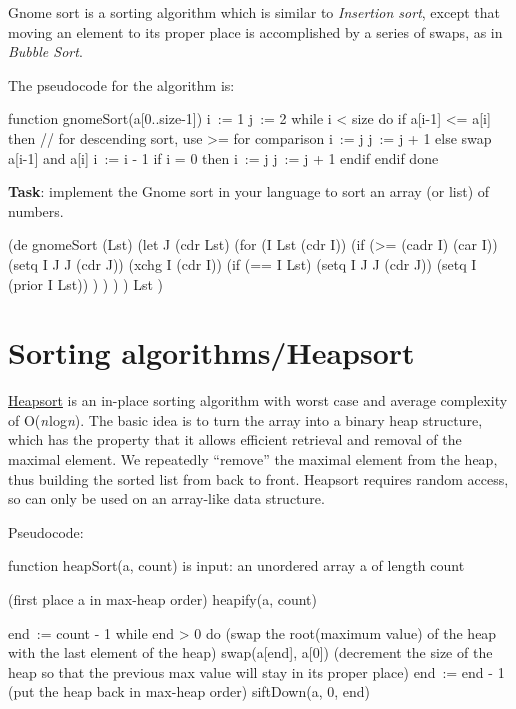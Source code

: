 Gnome sort is a sorting algorithm which is similar to \emph{Insertion
  sort}, except that moving an element to its proper place is
accomplished by a series of swaps, as in \emph{Bubble Sort}.

The pseudocode for the algorithm is:

\begin{wideverbatim}
function gnomeSort(a[0..size-1])
    i := 1
    j := 2
    while i < size do
        if a[i-1] <= a[i] then
            // for descending sort, use >= for comparison
            i := j
            j := j + 1 
        else
            swap a[i-1] and a[i]
            i := i - 1
            if i = 0 then
                i := j
                j := j + 1
            endif
        endif
    done
\end{wideverbatim}

\textbf{Task}: implement the Gnome sort in your language to sort an
array (or list) of numbers.

\begin{wideverbatim}
(de gnomeSort (Lst)
   (let J (cdr Lst)
      (for (I Lst (cdr I))
         (if (>= (cadr I) (car I))
            (setq I J  J (cdr J))
            (xchg I (cdr I))
            (if (== I Lst)
               (setq I J  J (cdr J))
               (setq I (prior I Lst)) ) ) ) )
   Lst )

\end{wideverbatim}

\pagebreak{}
\section*{Sorting algorithms/Heapsort}

\href{http://en.wikipedia.org/wiki/Heapsort}{Heapsort} is an in-place
sorting algorithm with worst case and average complexity of
O(\emph{n} log\emph{n}). The basic idea is to turn the array into a
binary heap structure, which has the property that it allows efficient
retrieval and removal of the maximal element. We repeatedly ``remove''
the maximal element from the heap, thus building the sorted list from
back to front. Heapsort requires random access, so can only be used on
an array-like data structure.

Pseudocode:

\begin{wideverbatim}
function heapSort(a, count) is
   input: an unordered array a of length count
 
   (first place a in max-heap order)
   heapify(a, count)
 
   end := count - 1
   while end > 0 do
      (swap the root(maximum value) of the heap with the
       last element of the heap)
      swap(a[end], a[0])
      (decrement the size of the heap so that the previous
       max value will stay in its proper place)
      end := end - 1
      (put the heap back in max-heap order)
      siftDown(a, 0, end)
\end{wideverbatim}

